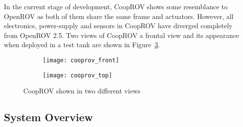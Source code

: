 In the current stage of development, CoopROV shows some resemblance to OpenROV as both of them share the same frame and actuators. However, all electronics, power-supply and sensors in CoopROV have diverged completely from OpenROV 2.5. Two views of CoopROV a frontal view and its appearance when deployed in a test tank are shown in Figure~\ref{fig:cooprov}.
%
\begin{figure}
  \centering
  \begin{subfigure}[]{0.45\textwidth}
      \texttt{[image: cooprov\_front]}
      \label{fig:cooprov_front}
  \end{subfigure}
  \begin{subfigure}[]{0.45\textwidth}
      \texttt{[image: cooprov\_top]}
      \label{subfig:cooprov_top}
  \end{subfigure}
  \caption[CoopROV]{CoopROV shown in two different views}
  \label{fig:cooprov}
\end{figure} 

\subsection{System Overview}

